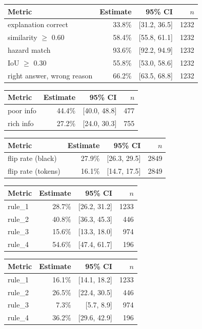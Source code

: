 \begin{tabular}{lrrr}
\toprule
Metric & Estimate & 95\% CI & $n$ \\
\midrule
explanation correct & 33.8\% & [31.2, 36.5] & 1232 \\
similarity $\geq$ 0.60 & 58.4\% & [55.8, 61.1] & 1232 \\
hazard match & 93.6\% & [92.2, 94.9] & 1232 \\
IoU $\geq$ 0.30 & 55.8\% & [53.0, 58.6] & 1232 \\
right answer, wrong reason & 66.2\% & [63.5, 68.8] & 1232 \\
\bottomrule
\end{tabular}

\begin{tabular}{lrrr}
\toprule
Metric & Estimate & 95\% CI & $n$ \\
\midrule
poor info & 44.4\% & [40.0, 48.8] & 477 \\
rich info & 27.2\% & [24.0, 30.3] & 755 \\
\bottomrule
\end{tabular}

\begin{tabular}{lrrr}
\toprule
Metric & Estimate & 95\% CI & $n$ \\
\midrule
flip rate (black) & 27.9\% & [26.3, 29.5] & 2849 \\
flip rate (tokens) & 16.1\% & [14.7, 17.5] & 2849 \\
\bottomrule
\end{tabular}

\begin{tabular}{lrrr}
\toprule
Metric & Estimate & 95\% CI & $n$ \\
\midrule
rule\_1 & 28.7\% & [26.2, 31.2] & 1233 \\
rule\_2 & 40.8\% & [36.3, 45.3] & 446 \\
rule\_3 & 15.6\% & [13.3, 18.0] & 974 \\
rule\_4 & 54.6\% & [47.4, 61.7] & 196 \\
\bottomrule
\end{tabular}

\begin{tabular}{lrrr}
\toprule
Metric & Estimate & 95\% CI & $n$ \\
\midrule
rule\_1 & 16.1\% & [14.1, 18.2] & 1233 \\
rule\_2 & 26.5\% & [22.4, 30.5] & 446 \\
rule\_3 & 7.3\% & [5.7, 8.9] & 974 \\
rule\_4 & 36.2\% & [29.6, 42.9] & 196 \\
\bottomrule
\end{tabular}

